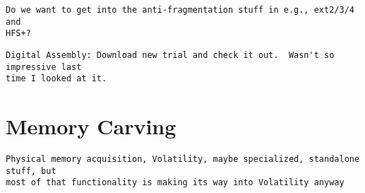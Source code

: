 \begin{Verbatim}
Do we want to get into the anti-fragmentation stuff in e.g., ext2/3/4 and 
HFS+?
\end{Verbatim}

\begin{Verbatim}
Digital Assembly: Download new trial and check it out.  Wasn't so impressive last
time I looked at it.
\end{Verbatim}

\section{Memory Carving}

\begin{Verbatim}
Physical memory acquisition, Volatility, maybe specialized, standalone stuff, but
most of that functionality is making its way into Volatility anyway
\end{Verbatim}